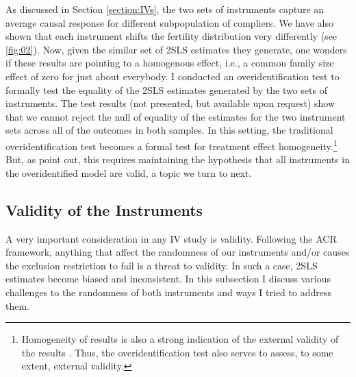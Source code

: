 As discussed in Section \ref{section:IVs}, the two sets of instruments capture an average causal response for different subpopulation of compliers. We have also shown that each instrument shifts the fertility distribution very differently (see \autoref{fig:02}). Now, given the similar set of 2SLS estimates they generate, one wonders if these results are pointing to a homogenous effect, i.e., a common family size effect of zero for just about everybody. I conducted an overidentification test to formally test the equality of the 2SLS estimates generated by the two sets of instruments. The test results (not presented, but available upon request) show that we cannot reject the null of equality of the estimates for the two instrument sets across all of the outcomes in both samples. In this setting, the traditional overidentification test becomes a formal test for treatment effect homogeneity.\footnote{ Homogeneity of results is also a strong indication of the external validity of the results \parencite[see][p.~776]{angrist_multiple_2010}. Thus, the overidentification test also serves to assess, to some extent, external validity. } But, as \textcite[p.~167]{Angrist2009} point out, this requires maintaining the hypothesis that all instruments in the overidentified model are valid, a topic we turn to next.


\subsection{Validity of the Instruments}
\label{section:valid}

A very important consideration in any IV study is validity. Following the ACR framework, anything that affect the randomness of our instruments and/or causes the exclusion restriction to fail is a threat to validity. In such a case, 2SLS estimates become biased and inconsistent. In this subsection I discuss various challenges to the randomness of both instruments and ways I tried to address them.

